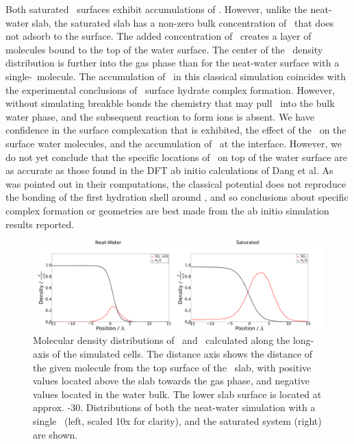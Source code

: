 Both saturated \suldiox~surfaces exhibit accumulations of \suldiox. However, unlike the neat-water slab, the saturated slab has a non-zero bulk concentration of \suldiox~that does not adsorb to the surface. The added concentration of \suldiox~creates a layer of molecules bound to the top of the water surface. The center of the \suldiox~density distribution is further into the gas phase than for the neat-water surface with a single-\suldiox~molecule. The accumulation of \suldiox~in this classical simulation coincides with the experimental conclusions of \suldiox~surface hydrate complex formation. However, without simulating breakble bonds the chemistry that may pull \suldiox~into the bulk water phase, and the subsequent reaction to form ions is absent. We have confidence in the surface complexation that is exhibited, the effect of the \suldiox~on the surface water molecules, and the accumulation of \suldiox~at the interface. However, we do not yet conclude that the specific locations of \suldiox~on top of the water surface are as accurate as those found in the DFT ab initio calculations of Dang et al.\cite{Baer2010} As was pointed out in their computations, the classical potential does not reproduce the bonding of the first hydration shell around \suldiox, and so conclusions about specific complex formation or geometries are best made from the ab initio simulation results reported.

\begin{figure}[h!]
	\begin{center}
		\includegraphics[scale=1.0]{images/density/density.png}
		\caption{Molecular density distributions of \wat~and \suldiox~calculated along the long-axis of the simulated cells. The distance axis shows the distance of the given molecule from the top surface of the \wat~slab, with positive values located above the slab towards the gas phase, and negative values located in the water bulk. The lower slab surface is located at approx. -30\angs. Distributions of both the neat-water simulation with a single \suldiox~(left, scaled 10x for clarity), and the saturated system (right) are shown.}
		\label{fig:density}
	\end{center}
\end{figure}
